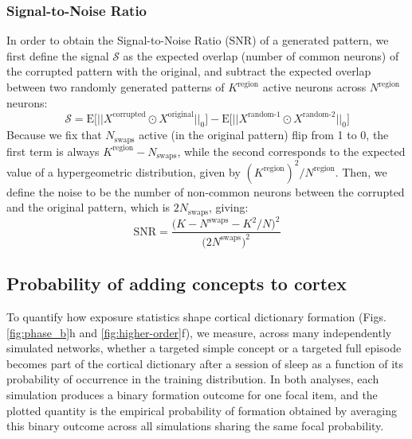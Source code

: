\documentclass{article}
\begin{document}
\subsubsection*{Signal-to-Noise Ratio}
In order to obtain the Signal-to-Noise Ratio (SNR) of a generated pattern, we first define the signal  $\mathcal{S}$  as the expected overlap (number of common neurons) of the corrupted pattern with the original, and subtract the expected overlap between two randomly generated patterns of $K^\textrm{region}$ active neurons across $N^\textrm{region}$ neurons:
\begin{equation}
\mathcal{S}  =  \textrm{E}\Big[|| X^\textrm{corrupted} \odot X^\textrm{original}||_0\Big] - \textrm{E}\Big[|| X^\textrm{random-1} \odot X^\textrm{random-2}||_0\Big]
\end{equation}
Because we fix that $N_\textrm{swaps}$ active (in the original pattern) flip from 1 to 0, the first term is always $K^\textrm{region} - N_\textrm{swaps}$, while the second corresponds to the expected value of a hypergeometric distribution, given by $(K^\textrm{region})^2/N^\textrm{region}$. Then, we define the noise to be the number of non-common neurons between the corrupted and the original pattern, which is $2N_\textrm{swaps}$, giving:
\begin{equation}
    \mathrm{SNR} = \frac{\Big(K - N^\textrm{swaps}- K^2/N\Big)^2}{\Big(2N^\textrm{swaps}\Big)^2}
    \label{eq:snr}
\end{equation}
\subsection*{Probability of adding concepts to cortex}
To quantify how exposure statistics shape cortical dictionary formation (Figs. \ref{fig:phase_b}h and \ref{fig:higher-order}f), we measure, across many independently simulated networks, whether a targeted simple concept or a targeted full episode becomes part of the cortical dictionary after a session of sleep as a function of its probability of occurrence in the training distribution. In both analyses, each simulation produces a binary formation outcome for one focal item, and the plotted quantity is the empirical probability of formation obtained by averaging this binary outcome across all simulations sharing the same focal probability.
\end{document}
